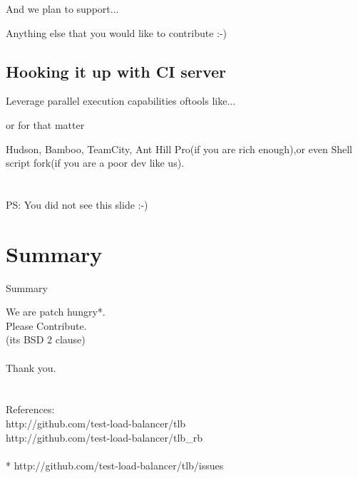 \documentclass{beamer}
\begin{document}
\begin{frame}{And we plan to support...}
  \begin{center}
    Anything else that you would like to contribute :-)
  \end{center}
\end{frame}

\subsection{Hooking it up with CI server}

\begin{frame}{Leverage parallel execution capabilities of}{tools like...}
  \begin{center}
  \end{center}
\end{frame}

\begin{frame}{or for that matter}
  \begin{center}
    {\huge Hudson, Bamboo, TeamCity, Ant Hill Pro}(if you are rich enough),{\huge or even Shell script fork}(if you are a poor dev like us).\\
    \quad\\\quad\\
    {\footnotesize PS: You did not see this slide :-)}
  \end{center}
\end{frame}


\section*{Summary}

\begin{frame}{Summary}{}
  \begin{centering}
  {\huge We are patch hungry*.\\Please Contribute.\\}
  (its BSD 2 clause)\\
  \quad\\
  {\huge Thank you.}\\
  \quad\\
  \quad\\
  References:\\
  http://github.com/test-load-balancer/tlb\\
  http://github.com/test-load-balancer/tlb\_rb\\
  \quad\\
  * http://github.com/test-load-balancer/tlb/issues\\
  \end{centering}
\end{frame}
\end{document}
